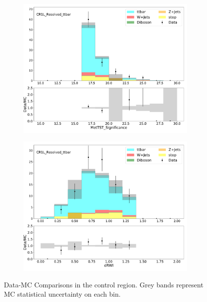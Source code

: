 \begin{figure}[htbp]
\begin{subfigure}{0.49\textwidth}
     \includegraphics[width = 0.98\textwidth]{Figures/4/datamc/CR1L_Resolved_ttbar/MetTST_Significance.pdf}
     \caption{\metsig}
     \end{subfigure}
     \begin{subfigure}{0.49\textwidth}
     \includegraphics[width = 0.98\textwidth]{Figures/4/datamc/CR1L_Resolved_ttbar/dRWl.pdf}
     \caption{\drWl}
     \end{subfigure}
     \caption{Data-MC Comparisons in the \resolved \ttbar control region. Grey bands represent MC statistical uncertainty on each bin.}
     \label{fig:Data_MC_CRbV_resolved}
     \end{figure}

